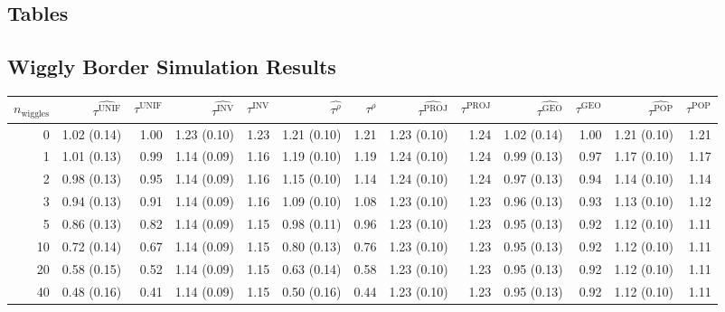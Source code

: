 \documentclass[letter]{article}
\newcommand{\unifavg}{\tau^{\mathrm{UNIF}}}
\newcommand{\invvar}{\tau^{\mathrm{INV}}}
\newcommand{\taurho}{\tau^{\rho}}
\newcommand{\tauproj}{\tau^{\mathrm{PROJ}}}
\newcommand{\taugeo}{\tau^{\mathrm{GEO}}}
\newcommand{\taupop}{\tau^{\mathrm{POP}}}
\begin{document}
\begin{landscape}
    	\hypertarget{tables}{%
\section{Tables}\label{tables}}

\hypertarget{wiggly-border-simulation-results}{%
\subsection{Wiggly Border Simulation Results}\label{wiggly-border-simulation-results}}
    

\begin{table}[!h]
\begin{tabular}{r|rrrrrrrrrrrr}
\hline
	$n_{\mathrm{wiggles}}$ & $\widehat{\unifavg}$ & $\unifavg$ & $\widehat{\invvar}$ & $\invvar$ & $\widehat{\taurho}$ & $\taurho$ & $\widehat{\tauproj}$ & $\tauproj$ & $\widehat{\taugeo}$ & $\taugeo$ & $\widehat{\taupop}$ & $\taupop$\\
		\hline
0        & 1.02 (0.14) & 1.00    & 1.23 (0.10) & 1.23   & 1.21 (0.10) & 1.21   & 1.23 (0.10) & 1.24    & 1.02 (0.14) & 1.00   & 1.21 (0.10) & 1.21   \\
1        & 1.01 (0.13) & 0.99    & 1.14 (0.09) & 1.16   & 1.19 (0.10) & 1.19   & 1.24 (0.10) & 1.24    & 0.99 (0.13) & 0.97   & 1.17 (0.10) & 1.17   \\
2        & 0.98 (0.13) & 0.95    & 1.14 (0.09) & 1.16   & 1.15 (0.10) & 1.14   & 1.24 (0.10) & 1.24    & 0.97 (0.13) & 0.94   & 1.14 (0.10) & 1.14   \\
3        & 0.94 (0.13) & 0.91    & 1.14 (0.09) & 1.16   & 1.09 (0.10) & 1.08   & 1.23 (0.10) & 1.23    & 0.96 (0.13) & 0.93   & 1.13 (0.10) & 1.12   \\
5        & 0.86 (0.13) & 0.82    & 1.14 (0.09) & 1.15   & 0.98 (0.11) & 0.96   & 1.23 (0.10) & 1.23    & 0.95 (0.13) & 0.92   & 1.12 (0.10) & 1.11   \\
10       & 0.72 (0.14) & 0.67    & 1.14 (0.09) & 1.15   & 0.80 (0.13) & 0.76   & 1.23 (0.10) & 1.23    & 0.95 (0.13) & 0.92   & 1.12 (0.10) & 1.11   \\
20       & 0.58 (0.15) & 0.52    & 1.14 (0.09) & 1.15   & 0.63 (0.14) & 0.58   & 1.23 (0.10) & 1.23    & 0.95 (0.13) & 0.92   & 1.12 (0.10) & 1.11   \\
40       & 0.48 (0.16) & 0.41    & 1.14 (0.09) & 1.15   & 0.50 (0.16) & 0.44   & 1.23 (0.10) & 1.23    & 0.95 (0.13) & 0.92   & 1.12 (0.10) & 1.11   \\

\end{tabular}
\end{table}
\end{landscape}
\end{document}
